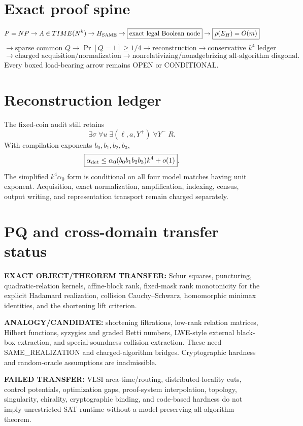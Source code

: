 \documentclass[11pt]{article}
\begin{document}
\section*{Exact proof spine}
\[
P=NP\to A\in TIME(N^k)\to H_{\rm SAME}
\to\boxed{\text{exact legal Boolean node}}
\to\boxed{\rho(E_H)=O(m)}
\]
\[
\to\text{sparse common }Q
\to\Pr[Q=1]\ge1/4
\to\text{reconstruction}
\to\boxed{\text{conservative }k^4\text{ ledger}}
\]
\[
\to\boxed{\text{charged acquisition/normalization}}
\to\boxed{\text{nonrelativizing/nonalgebrizing all-algorithm diagonal}}.
\]
Every boxed load-bearing arrow remains OPEN or CONDITIONAL.

\section*{Reconstruction ledger}
The fixed-coin audit still retains
\[
\boxed{\exists\sigma\;\forall u\;\exists(\ell,a,Y^+)\;\forall Y^-\;R}.
\]
With compilation exponents $b_0,b_1,b_2,b_3$,
\[
\boxed{\alpha_{\rm det}\le\alpha_0(b_0b_1b_2b_3)k^4+o(1)}.
\]
The simplified $k^4\alpha_0$ form is conditional on all four model matches having unit exponent. Acquisition, exact normalization, amplification, indexing, census, output writing, and representation transport remain charged separately.

\section*{PQ and cross-domain transfer status}
\textbf{EXACT OBJECT/THEOREM TRANSFER:} Schur squares, puncturing, quadratic-relation kernels, affine-block rank, fixed-mask rank monotonicity for the explicit Hadamard realization, collision Cauchy--Schwarz, homomorphic minimax identities, and the shortening lift criterion.

\textbf{ANALOGY/CANDIDATE:} shortening filtrations, low-rank relation matrices, Hilbert functions, syzygies and graded Betti numbers, LWE-style external black-box extraction, and special-soundness collision extraction. These need SAME\_REALIZATION and charged-algorithm bridges. Cryptographic hardness and random-oracle assumptions are inadmissible.

\textbf{FAILED TRANSFER:} VLSI area-time/routing, distributed-locality cuts, control potentials, optimization gaps, proof-system interpolation, topology, singularity, chirality, cryptographic binding, and code-based hardness do not imply unrestricted SAT runtime without a model-preserving all-algorithm theorem.
\end{document}
